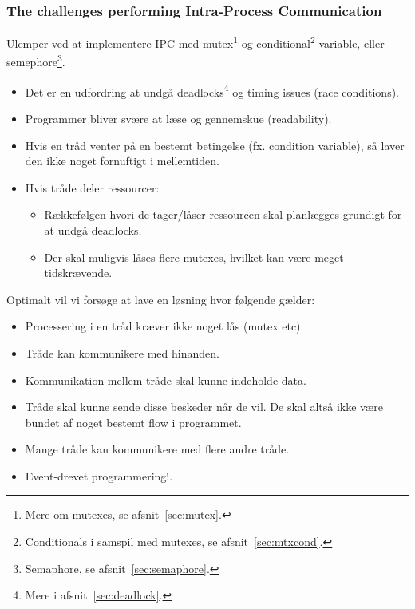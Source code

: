 \subsubsection{The challenges performing Intra-Process Communication}\label{sec:ipc}
Ulemper ved at implementere IPC med mutex\footnote{Mere om mutexes, se afsnit~\ref{sec:mutex}.} og conditional\footnote{Conditionals i samspil med mutexes, se afsnit~\ref{sec:mtxcond}.} variable, eller semephore\footnote{Semaphore, se afsnit~\ref{sec:semaphore}.}.

\begin{itemize}
	\item Det er en udfordring at undgå deadlocks\footnote{Mere i afsnit~\ref{sec:deadlock}.} og timing issues (race conditions).
	\item Programmer bliver svære at læse og gennemskue (readability).
	\item Hvis en tråd venter på en bestemt betingelse (fx. condition variable), så laver den ikke noget fornuftigt i mellemtiden.
	\item Hvis tråde deler ressourcer:
	\begin{itemize}
		\item Rækkefølgen hvori de tager/låser ressourcen skal planlægges grundigt for at undgå deadlocks.
		\item Der skal muligvis låses flere mutexes, hvilket kan være meget tidskrævende.
	\end{itemize}
\end{itemize}

Optimalt vil vi forsøge at lave en løsning hvor følgende gælder:

\begin{itemize}
	\item Processering i en tråd kræver ikke noget lås (mutex etc). 
	\item Tråde kan kommunikere med hinanden.
	\item Kommunikation mellem tråde skal kunne indeholde data.
	\item Tråde skal kunne sende disse beskeder når de vil. De skal altså ikke være bundet af noget bestemt flow i programmet.
	\item Mange tråde kan kommunikere med flere andre tråde.\\
	\item Event-drevet programmering!. 
\end{itemize}

